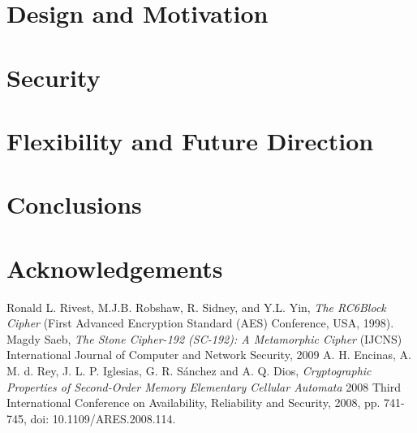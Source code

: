 \documentclass{article}
\begin{document}
\section{Design and Motivation}

\section{Security}

\section{Flexibility and Future Direction}

\section{Conclusions}

\section{Acknowledgements}

\begin{thebibliography}{unsrt}
  Ronald L. Rivest, M.J.B. Robshaw, R. Sidney, and Y.L. Yin, \emph{The RC6\texttrademark Block Cipher} (First Advanced Encryption Standard (AES) Conference, USA, 1998).
  Magdy Saeb, \emph{The Stone Cipher-192 (SC-192): A Metamorphic Cipher} (IJCNS) International Journal of Computer and Network Security, 2009
  A. H. Encinas, A. M. d. Rey, J. L. P. Iglesias, G. R. Sánchez and A. Q. Dios, \emph{Cryptographic Properties of Second-Order Memory Elementary Cellular Automata} 2008 Third International Conference on Availability, Reliability and Security, 2008, pp. 741-745, doi: 10.1109/ARES.2008.114.
\end{thebibliography}
\end{document}
